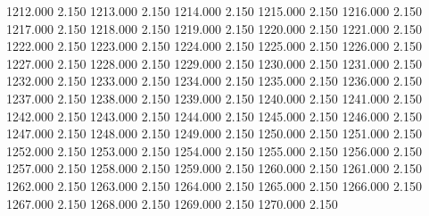 1212.000 2.150 
1213.000 2.150 
1214.000 2.150 
1215.000 2.150 
1216.000 2.150 
1217.000 2.150 
1218.000 2.150 
1219.000 2.150 
1220.000 2.150 
1221.000 2.150 
1222.000 2.150 
1223.000 2.150 
1224.000 2.150 
1225.000 2.150 
1226.000 2.150 
1227.000 2.150 
1228.000 2.150 
1229.000 2.150 
1230.000 2.150 
1231.000 2.150 
1232.000 2.150 
1233.000 2.150 
1234.000 2.150 
1235.000 2.150 
1236.000 2.150 
1237.000 2.150 
1238.000 2.150 
1239.000 2.150 
1240.000 2.150 
1241.000 2.150 
1242.000 2.150 
1243.000 2.150 
1244.000 2.150 
1245.000 2.150 
1246.000 2.150 
1247.000 2.150 
1248.000 2.150 
1249.000 2.150 
1250.000 2.150 
1251.000 2.150 
1252.000 2.150 
1253.000 2.150 
1254.000 2.150 
1255.000 2.150 
1256.000 2.150 
1257.000 2.150 
1258.000 2.150 
1259.000 2.150 
1260.000 2.150 
1261.000 2.150 
1262.000 2.150 
1263.000 2.150 
1264.000 2.150 
1265.000 2.150 
1266.000 2.150 
1267.000 2.150 
1268.000 2.150 
1269.000 2.150 
1270.000 2.150 
